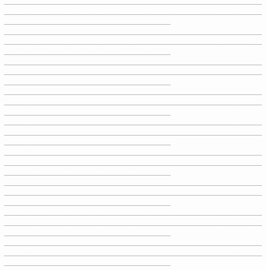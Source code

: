 \documentclass[12pt]{article}
\begin{document}
\_\_\_\_\_\_\_\_\_\_\_\_\_\_\_\_\_\_\_\_\_\_\_\_\_\_\_\_\_\_\_\_\_\_\_\_\_\_\_\_\_\_\_\_\_\_\_\_\_\_\_\_\_\_\_\_\_\_\_\_\_\_\_\_\_\_\_\_\_\_\_\_\_\_\_\_\_\_\_\_\_\_\_\_\_\_\_\_\_\_\_\_\_\_\_\_\_\_\_\_\_\_\_\_\_\_\_\_\_\_\_\_\_\_\_\_\_\_\_\_\_\_\_\_\_\_\_ \\\_\_\_\_\_\_\_\_\_\_\_\_\_\_\_\_\_\_\_\_\_\_\_\_\_\_\_\_\_\_\_\_\_\_\_\_\_\_\_\_\_\_\_\_\_\_\_\_\_\_\_\_\_\_\_\_\_\_\_\_\_\_\_\_\_\_\_\_\_\_\_\_\_\_\_\_\_\_\_\_\_\_\_\_\_\_\_\_\_\_\_\_\_\_\_\_\_\_\_\_\_\_\_\_\_\_\_\_\_\_\_\_\_\_\_\_\_\_\_\_\_\_\_\_\_\_\_ \\\_\_\_\_\_\_\_\_\_\_\_\_\_\_\_\_\_\_\_\_\_\_\_\_\_\_\_\_\_\_\_\_\_\_\_\_\_\_\_\_\_\_\_\_\_\_\_\_\_\_\_\_\_\_\_\_\_\_\_\_\_\_\_\_\_\_\_\_\_\_\_\_\_\_\_\_\_\_\_\_\_\_\_\_\_\_\_\_\_\_\_\_\_\_\_\_\_\_\_\_\_\_\_\_\_\_\_\_\_\_\_\_\_\_\_\_\_\_\_\_\_\_\_\_\_\_\_ \\\_\_\_\_\_\_\_\_\_\_\_\_\_\_\_\_\_\_\_\_\_\_\_\_\_\_\_\_\_\_\_\_\_\_\_\_\_\_\_\_\_\_\_\_\_\_\_\_\_\_\_\_\_\_\_\_\_\_\_\_\_\_\_\_\_\_\_\_\_\_\_\_\_\_\_\_\_\_\_\_\_\_\_\_\_\_\_\_\_\_\_\_\_\_\_\_\_\_\_\_\_\_\_\_\_\_\_\_\_\_\_\_\_\_\_\_\_\_\_\_\_\_\_\_\_\_\_ \\\_\_\_\_\_\_\_\_\_\_\_\_\_\_\_\_\_\_\_\_\_\_\_\_\_\_\_\_\_\_\_\_\_\_\_\_\_\_\_\_\_\_\_\_\_\_\_\_\_\_\_\_\_\_\_\_\_\_\_\_\_\_\_\_\_\_\_\_\_\_\_\_\_\_\_\_\_\_\_\_\_\_\_\_\_\_\_\_\_\_\_\_\_\_\_\_\_\_\_\_\_\_\_\_\_\_\_\_\_\_\_\_\_\_\_\_\_\_\_\_\_\_\_\_\_\_\_ \\\_\_\_\_\_\_\_\_\_\_\_\_\_\_\_\_\_\_\_\_\_\_\_\_\_\_\_\_\_\_\_\_\_\_\_\_\_\_\_\_\_\_\_\_\_\_\_\_\_\_\_\_\_\_\_\_\_\_\_\_\_\_\_\_\_\_\_\_\_\_\_\_\_\_\_\_\_\_\_\_\_\_\_\_\_\_\_\_\_\_\_\_\_\_\_\_\_\_\_\_\_\_\_\_\_\_\_\_\_\_\_\_\_\_\_\_\_\_\_\_\_\_\_\_\_\_\_ \\\_\_\_\_\_\_\_\_\_\_\_\_\_\_\_\_\_\_\_\_\_\_\_\_\_\_\_\_\_\_\_\_\_\_\_\_\_\_\_\_\_\_\_\_\_\_\_\_\_\_\_\_\_\_\_\_\_\_\_\_\_\_\_\_\_\_\_\_\_\_\_\_\_\_\_\_\_\_\_\_\_\_\_\_\_\_\_\_\_\_\_\_\_\_\_\_\_\_\_\_\_\_\_\_\_\_\_\_\_\_\_\_\_\_\_\_\_\_\_\_\_\_\_\_\_\_\_ \\\_\_\_\_\_\_\_\_\_\_\_\_\_\_\_\_\_\_\_\_\_\_\_\_\_\_\_\_\_\_\_\_\_\_\_\_\_\_\_\_\_\_\_\_\_\_\_\_\_\_\_\_\_\_\_\_\_\_\_\_\_\_\_\_\_\_\_\_\_\_\_\_\_\_\_\_\_\_\_\_\_\_\_\_\_\_\_\_\_\_\_\_\_\_\_\_\_\_\_\_\_\_\_\_\_\_\_\_\_\_\_\_\_\_\_\_\_\_\_\_\_\_\_\_\_\_\_ \\\_\_\_\_\_\_\_\_\_\_\_\_\_\_\_\_\_\_\_\_\_\_\_\_\_\_\_\_\_\_\_\_\_\_\_\_\_\_\_\_\_\_\_\_\_\_\_\_\_\_\_\_\_\_\_\_\_\_\_\_\_\_\_\_\_\_\_\_\_\_\_\_\_\_\_\_\_\_\_\_\_\_\_\_\_\_\_\_\_\_\_\_\_\_\_\_\_\_\_\_\_\_\_\_\_\_\_\_\_\_\_\_\_\_\_\_\_\_\_\_\_\_\_\_\_\_\_ 
\end{document}
